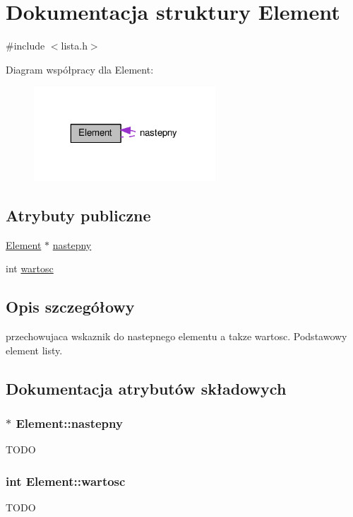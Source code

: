 \hypertarget{struct_element}{\section{Dokumentacja struktury Element}
\label{struct_element}
}


{\ttfamily \#include $<$lista.\+h$>$}



Diagram współpracy dla Element\+:
\nopagebreak
\begin{figure}[H]
\begin{center}
\leavevmode
\includegraphics[width=193pt]{struct_element__coll__graph}
\end{center}
\end{figure}
\subsection*{Atrybuty publiczne}
\begin{DoxyCompactItemize}
\item 
\hyperlink{struct_element}{Element} $\ast$ \hyperlink{struct_element_a04ef972f58a1777f38b54df88df2fc12}{nastepny}
\item 
int \hyperlink{struct_element_a6293e5d8101312d7e3bb95688dc7b261}{wartosc}
\end{DoxyCompactItemize}


\subsection{Opis szczegółowy}
przechowujaca wskaznik do nastepnego elementu a takze wartosc. Podstawowy element listy. 

\subsection{Dokumentacja atrybutów składowych}
\hypertarget{struct_element_a04ef972f58a1777f38b54df88df2fc12}{
\subsubsection[{nastepny}]{$\ast$ Element\+::nastepny}}\label{struct_element_a04ef972f58a1777f38b54df88df2fc12}
T\+O\+D\+O \hypertarget{struct_element_a6293e5d8101312d7e3bb95688dc7b261}{
\subsubsection[{wartosc}]{\setlength{\rightskip}{0pt plus 5cm}int Element\+::wartosc}}\label{struct_element_a6293e5d8101312d7e3bb95688dc7b261}
T\+O\+D\+O 


